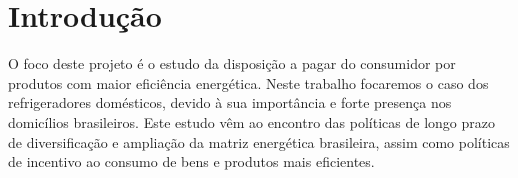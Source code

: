 \documentclass[
	12pt,				%
	openright,			%
	oneside,			%
	a4paper,			%
	english,			%
	french,				%
	spanish,			%
	brazil,				%
	]{abntex2}
\begin{document}
	 
	\listoffigures*
	\cleardoublepage
	\listoftables*
	\cleardoublepage



	\tableofcontents*
	\cleardoublepage
	\textual

	\chapter[Introdução]{Introdução}

		O foco deste projeto é o estudo da disposição a pagar do consumidor por produtos com maior eficiência energética. Neste trabalho focaremos o caso dos refrigeradores domésticos, devido à sua importância e forte presença nos domicílios brasileiros. Este estudo vêm ao encontro das políticas de longo prazo de diversificação e ampliação da matriz energética brasileira, assim como políticas de incentivo ao consumo de bens e produtos mais eficientes.
\end{document}
